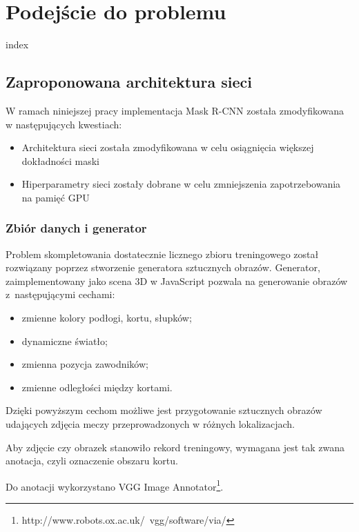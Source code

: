 \chapter{Podejście do problemu}

{index}

\section{Zaproponowana architektura sieci}
\label{sec:zaproponowana_architektura}

W ramach niniejszej pracy implementacja Mask R-CNN została zmodyfikowana w następujących kwestiach:

\begin{itemize}
	\item Architektura sieci została zmodyfikowana w celu osiągnięcia większej dokładności maski
	\item Hiperparametry sieci zostały dobrane w celu zmniejszenia zapotrzebowania na pamięć GPU
\end{itemize}


\subsection{Zbiór danych i generator}
\label{sec:generator}

Problem skompletowania dostatecznie licznego zbioru treningowego został rozwiązany poprzez stworzenie generatora sztucznych obrazów.
Generator, zaimplementowany jako scena 3D w JavaScript pozwala na generowanie obrazów z~następującymi cechami:

\begin{itemize}
	\item zmienne kolory podłogi, kortu, słupków;
	\item dynamiczne światło;
	\item zmienna pozycja zawodników;
	\item zmienne odległości między kortami.
\end{itemize}

Dzięki powyższym cechom możliwe jest przygotowanie sztucznych obrazów udających zdjęcia meczy przeprowadzonych w różnych lokalizacjach.

Aby zdjęcie czy obrazek stanowiło rekord treningowy, wymagana jest tak zwana anotacja, czyli oznaczenie obszaru kortu.

Do anotacji wykorzystano VGG Image Annotator\footnote{http://www.robots.ox.ac.uk/~vgg/software/via/}.
\\

